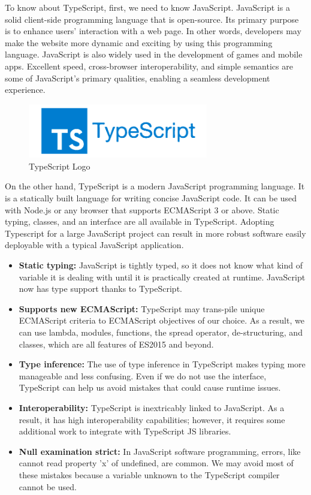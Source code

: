 To know about TypeScript, first, we need to know JavaScript. JavaScript is a solid client-side programming language that is open-source. Its primary purpose is to enhance users' interaction with a web page. In other words, developers may make the website more dynamic and exciting by using this programming language. JavaScript is also widely used in the development of games and mobile apps. Excellent speed, cross-browser interoperability, and simple semantics are some of JavaScript's primary qualities, enabling a seamless development experience.

\begin{figure}[H]
	\centering
	\includegraphics[width=0.7\textwidth]{img/technology/TypeScript.png}
	\caption{TypeScript Logo}
	\label{fig:TypeScriptLogo}
\end{figure}

On the other hand, TypeScript is a modern JavaScript programming language. It is a statically built language for writing concise JavaScript code. It can be used with Node.js or any browser that supports ECMAScript 3 or above. Static typing, classes, and an interface are all available in TypeScript. Adopting Typescript for a large JavaScript project can result in more robust software easily deployable with a typical JavaScript application.

\begin{itemize}
	\item \textbf{Static typing:} JavaScript is tightly typed, so it does not know what kind of variable it is dealing with until it is practically created at runtime. JavaScript now has type support thanks to TypeScript.
	\item \textbf{Supports new ECMAScript:} TypeScript may trans-pile unique ECMAScript criteria to ECMAScript objectives of our choice. As a result, we can use lambda, modules, functions, the spread operator, de-structuring, and classes, which are all features of ES2015 and beyond.
	\item \textbf{Type inference:} The use of type inference in TypeScript makes typing more manageable and less confusing. Even if we do not use the interface, TypeScript can help us avoid mistakes that could cause runtime issues.
	\item \textbf{Interoperability:} TypeScript is inextricably linked to JavaScript. As a result, it has high interoperability capabilities; however, it requires some additional work to integrate with TypeScript JS libraries.
	\item \textbf{Null examination strict:} In JavaScript software programming, errors, like cannot read property 'x' of undefined, are common. We may avoid most of these mistakes because a variable unknown to the TypeScript compiler cannot be used.
\end{itemize}

